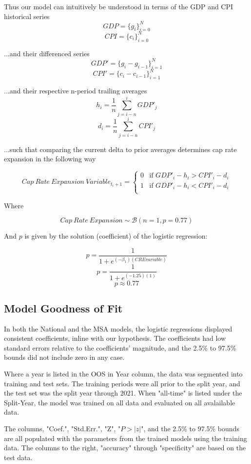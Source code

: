 \pagebreak

Thus our model can intuitively be understood in terms of the GDP and CPI historical series
\[GDP = \{g_i\}_{i=0}^N \]
\[CPI = \{c_i\}_{i=0}^N \]

...and their differenced series
\[GDP' = \{g_i-g_{i-1}\}_{i=1}^N \]
\[CPI' = \{c_i-c_{i-1}\}_{i=1}^N \]

...and their respective n-period trailing averages
\[h_i=\frac{1}{n} \sum_{j=i-n}^{i}GDP'_j\]
\[d_i=\frac{1}{n} \sum_{j=i-n}^{i}CPI'_j\]

...such that comparing the current delta to prior averages determines cap rate expansion in the following way

\[
  Cap\:Rate\:Expansion\:Variable_{t_i+1} =
  \begin{cases}
    0 & \text{if $GDP'_i-h_i > CPI'_i-d_i $} \\
    1 & \text{if $GDP'_i-h_i < CPI'_i-d_i $} \\
  \end{cases}
\]

Where 

\[
  Cap\:Rate\:Expansion \sim \mathcal{B}(n=1,p=0.77)  \]

And $p$ is given by the solution (coefficient) of the logistic regression:

\[
p=\frac{1}{1+e^{(-\beta_1)(CRE variable)}}\]
\[
p=\frac{1}{1+e^{(-1.25)(1)}}\]
\[p \approx 0.77\]

\subsection{Model Goodness of Fit}

In both the National and the MSA models, the logistic regressions displayed consistent coefficients, inline with our hypothesis. The coefficients had low standard errors relative  to the coefficients' magnitude, and the 2.5\% to 97.5\% bounds did not include zero in any case. 

Where a year is listed in the OOS in Year column, the data was segmented into training and test sets. The training periods were all prior to the split year, and the test set was the split year through 2021. When "all-time" is listed under the Split-Year, the model was trained on all data and evaluated on all avalailable data. 

The columns, "Coef.", "Std.Err.", "Z", "$P>|z|$", and the 2.5\% to 97.5\% bounds are all populated with the parameters from the trained models using the training data. The columns to the right, "accuracy" through "specificity" are based on the test data. 

